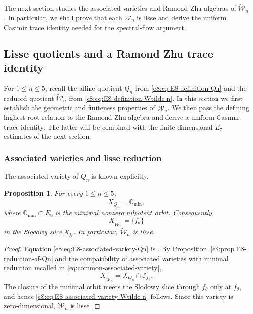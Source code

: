 \documentclass[11pt,reqno]{amsart}
\newtheorem{proposition}[theorem]{Proposition}
\theoremstyle{definition}
\theoremstyle{remark}
\providecommand{\W}{\mathcal{W}}
\begin{document}
The next section studies the associated varieties and Ramond Zhu algebras of
$\widetilde{\W}_n$.  In particular, we shall prove that each
$\widetilde{\W}_n$ is lisse and derive the uniform Casimir trace identity
needed for the spectral-flow argument.

\subsection{Lisse quotients and a Ramond Zhu trace identity}
\label{e8:sec:lisse-Ramond-trace}

For $1\le n\le5$, recall the affine quotient $Q_n$ from
\eqref{e8:eq:E8-definition-Qn} and the reduced quotient
$\widetilde{\W}_n$ from \eqref{e8:eq:E8-definition-Wtilde-n}.  In this section
we first establish the geometric and finiteness properties of
$\widetilde{\W}_n$.  We then pass the defining highest-root relation to the
Ramond Zhu algebra and derive a uniform Casimir trace identity.  The latter
will be combined with the finite-dimensional $E_7$ estimates of the next
section.

\subsubsection{Associated varieties and lisse reduction}


The associated variety of $Q_n$ is known explicitly.

\begin{proposition}
\label{e8:prop:E8-associated-variety-Qn}
For every $1\le n\le5$,
\begin{equation}
  X_{Q_n}=\overline{\mathbb O_{\min}},
  \label{e8:eq:E8-associated-variety-Qn}
\end{equation}
where $\mathbb O_{\min}\subset E_8$ is the minimal nonzero nilpotent orbit.
Consequently,
\begin{equation}
  X_{\widetilde{\W}_n}=\{f_{\theta}\}
  \label{e8:eq:E8-associated-variety-Wtilde-n}
\end{equation}
in the Slodowy slice $\mathcal S_{f_{\theta}}$.  In particular,
$\widetilde{\W}_n$ is lisse.
\end{proposition}

\begin{proof}
Equation \eqref{e8:eq:E8-associated-variety-Qn} is
\cite[Proposition~5.2]{ArakawaMoreau2018}.  By
Proposition~\ref{e8:prop:E8-reduction-of-Qn} and the compatibility of associated
varieties with minimal reduction recalled in
\eqref{eq:common-associated-variety},
\begin{equation*}
  X_{\widetilde{\W}_n}
  =X_{Q_n}\cap\mathcal S_{f_{\theta}}.
\end{equation*}
The closure of the minimal orbit meets the Slodowy slice through
$f_{\theta}$ only at $f_{\theta}$, and hence
\eqref{e8:eq:E8-associated-variety-Wtilde-n} follows.  Since this variety is
zero-dimensional, $\widetilde{\W}_n$ is lisse.
\end{proof}
\end{document}

